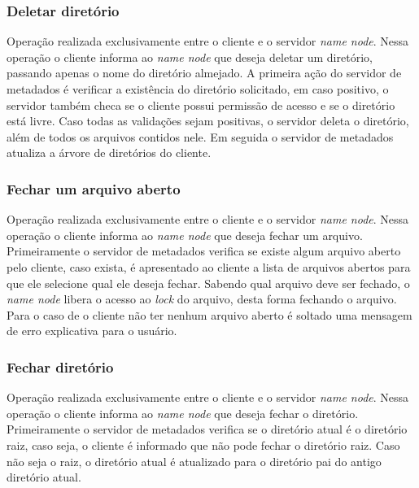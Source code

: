 	\subsubsection{Deletar diretório}
	
	Operação realizada exclusivamente entre o cliente e o servidor \textit{name node}. Nessa operação o cliente informa ao \textit{name node} que deseja deletar um diretório, passando apenas o nome do diretório almejado. A primeira ação do servidor de metadados é verificar a existência do diretório solicitado, em caso positivo, o servidor também checa se o cliente possui permissão de acesso e se o diretório está livre. Caso todas as validações sejam positivas, o servidor deleta o diretório, além de todos os arquivos contidos nele. Em seguida o servidor de metadados atualiza a árvore de diretórios do cliente.
	\\
	
	\subsubsection{Fechar um arquivo aberto}
	
	Operação realizada exclusivamente entre o cliente e o servidor \textit{name node}. Nessa operação o cliente informa ao \textit{name node} que deseja fechar um arquivo. Primeiramente o servidor de metadados verifica se existe algum arquivo aberto pelo cliente, caso exista, é apresentado ao cliente a lista de arquivos abertos para que ele selecione qual ele deseja fechar. Sabendo qual arquivo deve ser fechado, o \textit{name node} libera o acesso ao \textit{lock} do arquivo, desta forma fechando o arquivo. Para o caso de o cliente não ter nenhum arquivo aberto é soltado uma mensagem de erro explicativa para o usuário.
	\\
	
	\subsubsection{Fechar diretório}
	
	Operação realizada exclusivamente entre o cliente e o servidor \textit{name node}. Nessa operação o cliente informa ao \textit{name node} que deseja fechar o diretório. Primeiramente o servidor de metadados verifica se o diretório atual é o diretório raiz, caso seja, o cliente é informado que não pode fechar o diretório raiz. Caso não seja o raiz, o diretório atual é atualizado para o diretório pai do antigo diretório atual.
	\\
	
